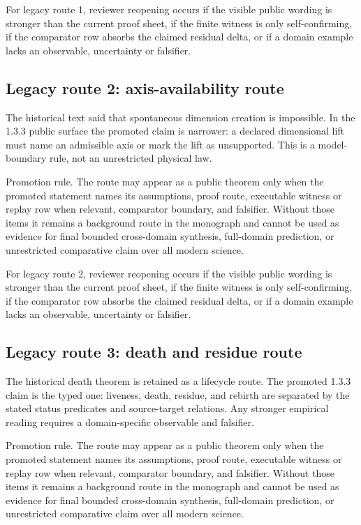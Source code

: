 For legacy route 1, reviewer reopening occurs if the visible public wording is stronger than the current proof sheet, if the finite witness is only self-confirming, if the comparator row absorbs the claimed residual delta, or if a domain example lacks an observable, uncertainty or falsifier.


\subsection{Legacy route 2: axis-availability route}

The historical text said that spontaneous dimension creation is impossible. In the 1.3.3 public surface the promoted claim is narrower: a declared dimensional lift must name an admissible axis or mark the lift as unsupported. This is a model-boundary rule, not an unrestricted physical law.


Promotion rule. The route may appear as a public theorem only when the promoted statement names its assumptions, proof route, executable witness or replay row when relevant, comparator boundary, and falsifier. Without those items it remains a background route in the monograph and cannot be used as evidence for final bounded cross-domain synthesis, full-domain prediction, or unrestricted comparative claim over all modern science.


For legacy route 2, reviewer reopening occurs if the visible public wording is stronger than the current proof sheet, if the finite witness is only self-confirming, if the comparator row absorbs the claimed residual delta, or if a domain example lacks an observable, uncertainty or falsifier.


\subsection{Legacy route 3: death and residue route}

The historical death theorem is retained as a lifecycle route. The promoted 1.3.3 claim is the typed one: liveness, death, residue, and rebirth are separated by the stated status predicates and source-target relations. Any stronger empirical reading requires a domain-specific observable and falsifier.


Promotion rule. The route may appear as a public theorem only when the promoted statement names its assumptions, proof route, executable witness or replay row when relevant, comparator boundary, and falsifier. Without those items it remains a background route in the monograph and cannot be used as evidence for final bounded cross-domain synthesis, full-domain prediction, or unrestricted comparative claim over all modern science.


